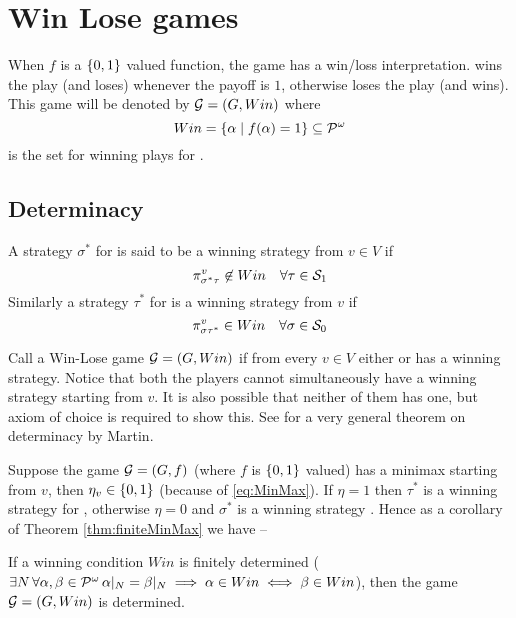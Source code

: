 \section{Win Lose games}
\label{sec:winlose}
When $f$ is a $\left\{0,1\right\}$ valued function, the game has a win/loss interpretation.  wins the play (and  loses) whenever the payoff is $1$, otherwise  loses the play (and  wins). This game will be denoted by $\mathcal{G}=(G,Win)$ where
\[
Win = \left\{ \alpha \mid f(\alpha) = 1\right\} \subseteq \mathcal{P}^\omega
\]
is the set for winning plays for .

\subsection{Determinacy}
\label{subsec:determinacy}
A strategy $\sigma^*$ for  is said to be a winning strategy from $v \in V$ if 
\[
    \pi^v_{\sigma^*\tau} \not\in Win \quad \forall \tau \in \mathcal{S}_1
\]
Similarly a strategy $\tau^*$ for  is a winning strategy from $v$ if
\[
    \pi^v_{\sigma\tau^*} \in Win \quad \forall \sigma \in \mathcal{S}_0
\]

Call a Win-Lose game $\mathcal{G}=(G,Win)$  if from every $v \in V$ either  or  has a winning strategy. Notice that both the players cannot simultaneously have a winning strategy starting from $v$. It is also possible that neither of them has one, but axiom of choice is required to show this. See \cite{martin_borel_1975} for a very general theorem on determinacy by Martin.

Suppose the game $\mathcal{G}=(G,f)$ (where $f$ is $\left\{0,1\right\}$ valued) has a minimax \eqminmax starting from $v$, then $\eta_v \in \left\{0,1\right\}$ (because of \eqref{eq:MinMax}). If $\eta=1$ then $\tau^*$ is a winning strategy for , otherwise $\eta=0$ and $\sigma^*$ is a winning strategy . Hence as a corollary of Theorem \ref{thm:finiteMinMax} we have --
\\
\begin{corollary}
    \label{cor:finiteDeterminacy}
    If a winning condition $Win$ is finitely determined ($\exists N \, \forall \alpha,\beta \in \mathcal{P}^\omega \, \alpha|_N = \beta|_N \implies \alpha \in Win \iff \beta \in Win$), then the game $\mathcal{G}=(G,Win)$ is determined.
\end{corollary}
